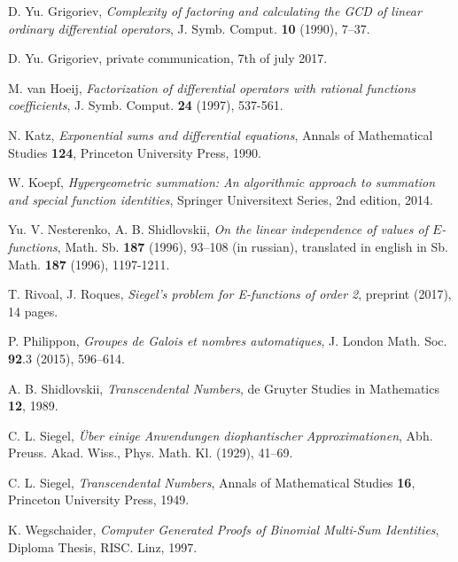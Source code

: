 \documentclass[reqno,english,12pt,a4paper]{smfart}
\numberwithin{equation}{section}
\begin{document}
\begin{thebibliography}{1}
 D. Yu. Grigoriev, {\em Complexity of factoring and calculating the GCD of linear 
ordinary differential operators}, 
J. Symb. Comput. {\bf 10} (1990), 7--37. 

 D. Yu. Grigoriev, private communication, 7th of july 2017. 


 M. van Hoeij, {\em Factorization of differential operators with rational functions coefficients}, J. Symb. Comput. {\bf 24} (1997), 537-561.

 N. Katz, {\em Exponential sums and differential equations}, Annals of Mathematical Studies {\bf 124}, Princeton University Press,  1990.

 W. Koepf, {\em Hypergeometric summation: An algorithmic approach to summation and special function identities}, 
Springer Universitext Series, 2nd edition, 2014.


 Yu. V. Nesterenko, A. B. Shidlovskii, {\em On the linear independence of values of $E$-functions}, Math. Sb. {\bf 187} (1996), 93--108 (in russian), translated in english in Sb. Math. {\bf 187} (1996), 1197-1211.

 T. Rivoal, J. Roques, {\em Siegel's problem for E-functions of order 2}, preprint (2017), 14 pages. 


 P. Philippon, {\em Groupes de Galois  et nombres automatiques}, J. London Math. Soc.  {\bf 92}.3 (2015), 596--614.

 A. B. Shidlovskii, {\em Transcendental Numbers}, de Gruyter Studies in Mathematics {\bf 12},
1989.

  C. L. Siegel, {\it \"Uber einige Anwendungen diophantischer Approximationen}, Abh. Preuss. Akad. Wiss., Phys. Math. Kl. (1929), 41--69. 

 C. L. Siegel, {\em Transcendental Numbers}, Annals of Mathematical Studies {\bf 16}, Princeton University Press, 1949.


 K. Wegschaider, {\em Computer Generated Proofs of Binomial Multi-Sum Identities}, Diploma Thesis, RISC. Linz, 1997.


\end{thebibliography}
\end{document}
